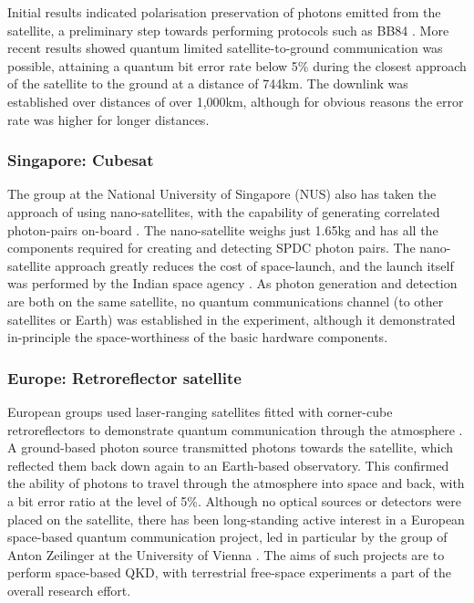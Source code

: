 Initial results indicated polarisation preservation of photons emitted from the satellite, a preliminary step towards performing protocols such as BB84 \cite{bib:carrasco2016leo}. More recent results showed quantum limited satellite-to-ground communication was possible, attaining a quantum bit error rate below 5\% \cite{bib:takenaka2017} during the closest approach of the satellite to the ground at a distance of 744km. The downlink was established over distances of over 1,000km, although for obvious reasons the error rate was higher for longer distances.

%
%

\subsubsection{Singapore: Cubesat}

The group at the National University of Singapore (NUS) also has taken the approach of using nano-satellites, with the capability of generating correlated photon-pairs on-board \cite{bib:tang2016generation}. The nano-satellite weighs just 1.65kg and has all the components required for creating and detecting SPDC photon pairs. The nano-satellite approach greatly reduces the cost of space-launch, and the launch itself was performed by the Indian space agency . As photon generation and detection are both on the same satellite, no quantum communications channel (to other satellites or Earth) was established in the experiment, although it demonstrated in-principle the space-worthiness of the basic hardware components. 

%
%

\subsubsection{Europe: Retroreflector satellite}

European groups used laser-ranging satellites fitted with corner-cube retroreflectors to demonstrate quantum communication through the atmosphere \cite{bib:villoresi08, bib:vallone15}. A ground-based photon source transmitted photons towards the satellite, which reflected them back down again to an Earth-based observatory. This confirmed the ability of photons to travel through the atmosphere into space and back, with a bit error ratio at the level of 5\%. Although no optical sources or detectors were placed on the satellite, there has been long-standing active interest in a European space-based quantum communication project, led in particular by the group of Anton Zeilinger at the University of Vienna \cite{bib:armengol08}. The aims of such projects are to perform space-based QKD, with terrestrial free-space experiments \cite{bib:ursin07, bib:ma2012quantum} a part of the overall research effort. 

